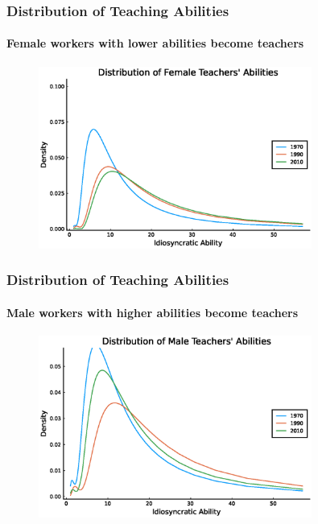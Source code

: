 \documentclass[11pt]{beamer}
\begin{document}
\begin{frame}
\frametitle{Distribution of Teaching Abilities}
\framesubtitle{Female workers with lower abilities become teachers}
\begin{figure}
 \begin{center}
\includegraphics[width=0.8\textwidth]{plots/counterfactuals/counter_1/fT_women_steadystate.eps}
 			\label{ }
 		\end{center}
 	\end{figure}
\end{frame}

\begin{frame}
\frametitle{Distribution of Teaching Abilities}
\framesubtitle{Male workers with higher abilities become teachers}
\begin{figure}
 		\begin{center}
\includegraphics[width=0.8\textwidth]{plots/counterfactuals/counter_1/fT_men_steadystate.eps}
 			\label{ }
 		\end{center}
 	\end{figure}
\end{frame}

\end{document}
